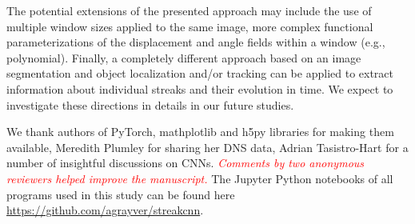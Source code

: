 \documentclass{svjour3}                     %
\newcommand{\new}[1]{\textit{\textcolor{red}{#1}}}
\begin{document}
The potential extensions of the presented approach may include the use of multiple window sizes applied to the same image, more complex functional parameterizations of the displacement and angle fields within a window (e.g., polynomial). Finally, a completely different approach based on an image segmentation and object localization and/or tracking can be applied to extract information about individual streaks and their evolution in time. We expect to investigate these directions in details in our future studies.

\begin{acknowledgements}
We thank authors of PyTorch, mathplotlib and h5py libraries for making them available, Meredith Plumley for sharing her DNS data, Adrian Tasistro-Hart for a number of insightful discussions on CNNs. \new{Comments by two anonymous reviewers helped improve the manuscript.} The Jupyter Python notebooks of all programs used in this study can be found here \url{https://github.com/agrayver/streakcnn}.
\end{acknowledgements}

%
\end{document}

